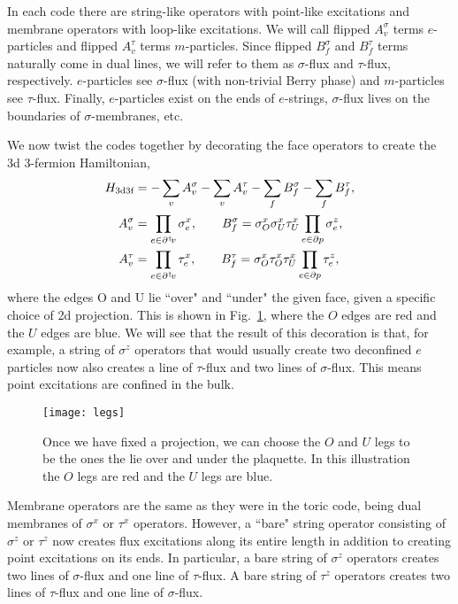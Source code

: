 In each code there are string-like operators with point-like excitations and membrane operators with loop-like excitations. We will call flipped $A_v^\sigma$ terms $e$-particles and flipped $A_v^\tau$ terms $m$-particles. Since flipped $B_f^\sigma$ and $B_f^\tau$ terms naturally come in dual lines, we will refer to them as $\sigma$-flux and $\tau$-flux, respectively. $e$-particles see $\sigma$-flux (with non-trivial Berry phase) and $m$-particles see $\tau$-flux. Finally, $e$-particles exist on the ends of $e$-strings, $\sigma$-flux lives on the boundaries of $\sigma$-membranes, etc.

We now twist the codes together by decorating the face operators to create the 3d 3-fermion Hamiltonian,
\begin{align}
H_{\text{3d3f}} &= -\sum_vA_v^{\sigma}-\sum_vA_v^{\tau}-\sum_fB_f^{\sigma}-\sum_fB_f^{\tau},\nonumber\\
A_v^{\sigma} &= \prod_{e\in \partial^\dagger\! v}\sigma_e^x, \qquad B_f^{\sigma} = \sigma_O^x\sigma_U^x\tau_U^x\prod_{e\in\partial p}\sigma_e^z,\nonumber\\
A_v^{\tau} &= \prod_{e\in \partial^\dagger\! v}\tau_e^x, \qquad B_f^{\tau} = \sigma^x_O\tau^x_O\tau^x_U\prod_{e\in\partial p}\tau_e^z, \label{eqn:3d3f}
\end{align}
where the edges O and U lie ``over" and ``under" the given face, given a specific choice of 2d projection. This is shown in Fig.~\ref{fig:legs}, where the $O$ edges are red and the $U$ edges are blue. We will see that the result of this decoration is that, for example, a string of $\sigma^z$ operators that would usually create two deconfined $e$ particles now also creates a line of $\tau$-flux and two lines of $\sigma$-flux. This means point excitations are confined in the bulk.
	
\begin{figure}
\centering
\texttt{[image: legs]}
\caption[Definition of $O$ and $U$ legs in the Walker-Wang model]{Once we have fixed a projection, we can choose the $O$ and $U$ legs to be the ones the lie over and under the plaquette. In this illustration the $O$ legs are red and the $U$ legs are blue.}
\label{fig:legs}
\end{figure}

Membrane operators are the same as they were in the toric code, being dual membranes of $\sigma^x$ or $\tau^x$ operators. However, a ``bare" string operator consisting of $\sigma^z$ or $\tau^z$ now creates flux excitations along its entire length in addition to creating point excitations on its ends. In particular, a bare string of $\sigma^z$ operators creates two lines of $\sigma$-flux and one line of $\tau$-flux. A bare string of $\tau^z$ operators creates two lines of $\tau$-flux and one line of $\sigma$-flux.

